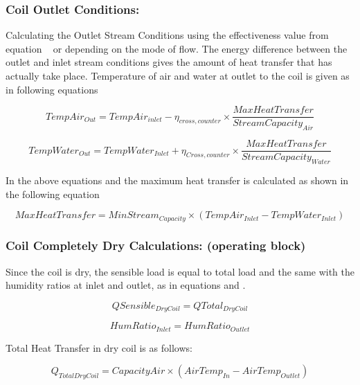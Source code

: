 \subsubsection{Coil Outlet Conditions:}\label{coil-outlet-conditions}

Calculating the Outlet Stream Conditions using the effectiveness value from equation ~ or depending on the mode of flow. The energy difference between the outlet and inlet stream conditions gives the amount of heat transfer that has actually take place. Temperature of air and water at outlet to the coil is given as in following equations

\begin{equation}
TempAi{r_{Out}} = TempAi{r_{inlet}} - {\eta_{cross,counter}} \times \frac{{MaxHeatTransfer}}{{StreamCapacit{y_{Air}}}}
\end{equation}

\begin{equation}
TempWate{r_{Out}} = TempWate{r_{Inlet}} + {\eta_{Cross,counter}} \times \frac{{MaxHeatTransfer}}{{StreamCapacit{y_{Water}}}}
\end{equation}

In the above equations and the maximum heat transfer is calculated as shown in the following equation

\begin{equation}
MaxHeatTransfer = MinStrea{m_{Capacity}} \times (TempAi{r_{Inlet}} - TempWate{r_{Inlet}})
\end{equation}

\subsubsection{Coil Completely Dry Calculations: (operating block)}\label{coil-completely-dry-calculations-operating-block}

Since the coil is dry, the sensible load is equal to total load and the same with the humidity ratios at inlet and outlet, as in equations and .

\begin{equation}
QSensibl{e_{DryCoil}} = QTota{l_{DryCoil}}
\end{equation}

\begin{equation}
HumRati{o_{Inlet}} = HumRati{o_{Outlet}}
\end{equation}

Total Heat Transfer in dry coil is as follows:

\begin{equation}
{Q_{TotalDryCoil}} = CapacityAir \times (AirTem{p_{In}} - AirTem{p_{Outlet}})
\end{equation}

